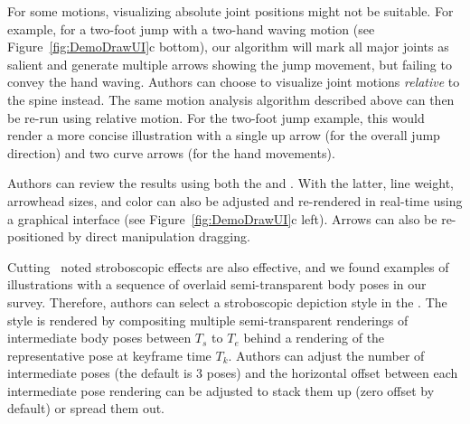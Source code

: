 For some motions, visualizing absolute joint positions might not be suitable.
For example, for a two-foot jump with a two-hand waving motion (see Figure~\ref{fig:DemoDrawUI}c bottom), our algorithm will mark all major joints as salient and generate multiple arrows showing the jump movement, but failing to convey the hand waving.
%
Authors can choose to visualize joint motions \textit{relative} to the spine instead.
The same motion analysis algorithm described above can then be re-run using relative motion.
For the two-foot jump example, this would render a more concise illustration with a single up arrow (for the overall jump direction) and two curve arrows (for the hand movements).

Authors can review the results using both the \phaseI{} and \phaseII{}. With the latter, line weight, arrowhead sizes, and color can also be adjusted and re-rendered in real-time using a graphical interface (see Figure~\ref{fig:DemoDrawUI}c left). Arrows can also be re-positioned by direct manipulation dragging.

Cutting~\cite{cutting_representing_2002} noted stroboscopic effects are also effective, and we found examples of illustrations with a sequence of overlaid semi-transparent body poses in our survey.
%
Therefore, authors can select a stroboscopic depiction style in the \phaseII{}.
The style is rendered by compositing multiple semi-transparent renderings of intermediate body poses between $T_s$ to $T_e$ behind a rendering of the representative pose at keyframe time $T_k$.
Authors can adjust the number of intermediate poses (the default is 3 poses) and the horizontal offset between each intermediate pose rendering can be adjusted to stack them up (zero offset by default) or spread them out.


